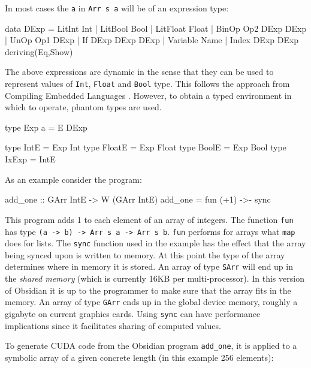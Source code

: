 In most cases the {\tt a} in {\tt Arr s a} will be of an expression type: 
\begin{code} 
data DExp = LitInt Int
          | LitBool Bool
          | LitFloat Float 
          | BinOp Op2 DExp DExp 
          | UnOp  Op1 DExp 
          | If DExp DExp DExp 
          | Variable Name 
          | Index DExp DExp  
            deriving(Eq,Show)
\end{code} 

The above expressions are dynamic in the sense that they can be used to 
represent values of {\tt Int}, {\tt Float} and {\tt Bool} type. 
This follows the approach from Compiling Embedded Languages 
\cite{Elliott03:CompileDSEL-JFP}. However, 
to obtain a typed environment in which to operate, phantom types are used. 

\begin{code} 
type Exp a = E DExp

type IntE   = Exp Int
type FloatE = Exp Float
type BoolE  = Exp Bool
type IxExp  = IntE 
\end{code}

As an example consider the program: 
\begin{code} 
add_one :: GArr IntE -> W (GArr IntE)
add_one = fun (+1) ->- sync
\end{code} 
This program adds 1 to each element of an array of integers. The function {\tt fun}
has type {\tt (a -> b) -> Arr s a -> Arr s b}. {\tt fun} performs for arrays what 
{\tt map} does for lists. 
The {\tt sync} function used in the example has the effect that
the array being synced upon is written to memory. At this point the type of 
the array determines where in memory it is stored. An array of type {\tt SArr} 
will end up in the {\em shared memory} (which is currently 16KB per multi-processor). 
In this version of Obsidian it is up to the programmer to make sure that the 
array fits in the memory. An array of type  {\tt GArr} ends up in the global 
device memory, roughly a gigabyte on current graphics cards.  Using {\tt sync} 
can have performance implications since it facilitates sharing of computed 
values. 

To generate CUDA code from the Obsidian program {\tt add\_one}, it is applied to
a symbolic array of a given concrete length (in this example 256 elements): 

